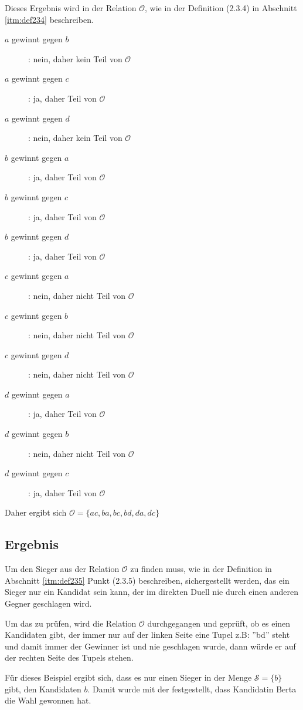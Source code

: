 Dieses Ergebnis wird in der Relation $\mathcal{O}$, wie in der Definition (2.3.4) in Abschnitt \ref{itm:def234} beschreiben.
\newpage
\begin{description}
\item[$a$ gewinnt gegen $b$]: nein, daher kein Teil von $\mathcal{O}$ 
\item[$a$ gewinnt gegen $c$]: ja, daher Teil von $\mathcal{O}$ 
\item[$a$ gewinnt gegen $d$]: nein, daher kein Teil von $\mathcal{O}$ 
\item[$b$ gewinnt gegen $a$]: ja, daher Teil von $\mathcal{O}$ 
\item[$b$ gewinnt gegen $c$]: ja, daher Teil von $\mathcal{O}$ 
\item[$b$ gewinnt gegen $d$]: ja, daher Teil von $\mathcal{O}$ 
\item[$c$ gewinnt gegen $a$]: nein, daher nicht Teil von $\mathcal{O}$ 
\item[$c$ gewinnt gegen $b$]: nein, daher nicht Teil von $\mathcal{O}$ 
\item[$c$ gewinnt gegen $d$]: nein, daher nicht Teil von $\mathcal{O}$ 
\item[$d$ gewinnt gegen $a$]: ja, daher Teil von $\mathcal{O}$ 
\item[$d$ gewinnt gegen $b$]: nein, daher nicht Teil von $\mathcal{O}$ 
\item[$d$ gewinnt gegen $c$]: ja, daher Teil von $\mathcal{O}$ 
\end{description} 

Daher ergibt sich $\mathcal{O} = \{ ac,ba,bc,bd,da,dc \}$

\subsection{Ergebnis} 
\label{sec:ergebnis1}
Um den Sieger aus der Relation $\mathcal{O}$ zu finden muss, wie in der Definition in Abschnitt \ref{itm:def235} Punkt (2.3.5) beschreiben, sichergestellt werden, das ein Sieger nur ein Kandidat sein kann, der im direkten Duell nie durch einen anderen Gegner geschlagen wird.

Um das zu prüfen, wird die Relation $\mathcal{O}$ durchgegangen und geprüft, ob es einen Kandidaten gibt, der immer nur auf der linken Seite eine Tupel z.B: ''bd'' steht und damit immer der Gewinner ist und nie geschlagen wurde, dann würde er auf der rechten Seite des Tupels stehen.

Für dieses Beispiel ergibt sich, dass es nur einen Sieger in der Menge $\mathcal{S}=\{b\}$ gibt, den Kandidaten $b$. Damit wurde mit der \schulze festgestellt, dass Kandidatin Berta die Wahl gewonnen hat.

